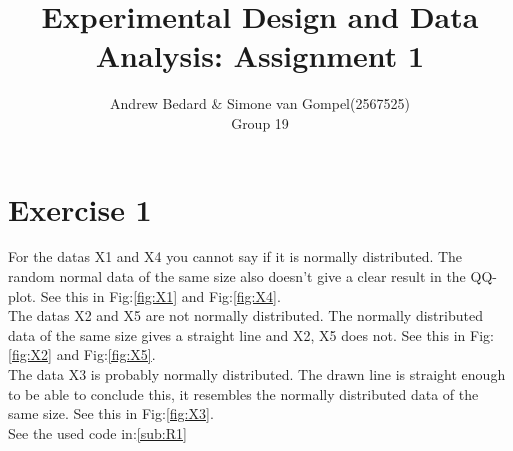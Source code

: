 \documentclass{article}
\title{Experimental Design and Data Analysis: Assignment 1}
\author{Andrew Bedard \& Simone van Gompel(2567525) \\ Group 19}
\begin{document}
  \maketitle

  \section{Exercise 1}
    For the datas X1 and X4 you cannot say if it is normally distributed.
    The random normal data of the same size also doesn't give a clear result in the QQ-plot.
    See this in Fig:\ref{fig:X1} and Fig:\ref{fig:X4}.\\
    The datas X2 and X5 are not normally distributed.
    The normally distributed data of the same size gives a straight line and X2, X5 does not.
    See this in Fig:\ref{fig:X2} and Fig:\ref{fig:X5}.\\
    The data X3 is probably normally distributed.
    The drawn line is straight enough to be able to conclude this, it resembles the normally distributed data of the same size.
    See this in Fig:\ref{fig:X3}.\\
    See the used code in:\ref{sub:R1}
\end{document}
